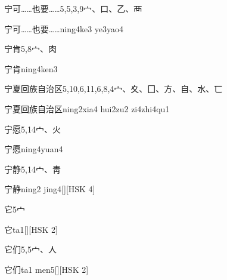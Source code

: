 \begin{Entry}{宁可……也要……}{5,5,3,9}{⼧、⼝、⼄、⾑}
  \begin{Phonetics}{宁可……也要……}{ning4ke3 ye3yao4}
  \end{Phonetics}
\end{Entry}

\begin{Entry}{宁肯}{5,8}{⼧、⾁}
  \begin{Phonetics}{宁肯}{ning4ken3}
  \end{Phonetics}
\end{Entry}

\begin{Entry}{宁夏回族自治区}{5,10,6,11,6,8,4}{⼧、⼢、⼞、⽅、⾃、⽔、⼖}
  \begin{Phonetics}{宁夏回族自治区}{ning2xia4 hui2zu2 zi4zhi4qu1}
  \end{Phonetics}
\end{Entry}

\begin{Entry}{宁愿}{5,14}{⼧、⽕}
  \begin{Phonetics}{宁愿}{ning4yuan4}
  \end{Phonetics}
\end{Entry}

\begin{Entry}{宁静}{5,14}{⼧、⾭}
  \begin{Phonetics}{宁静}{ning2 jing4}[][HSK 4]
  \end{Phonetics}
\end{Entry}

\begin{Entry}{它}{5}{⼧}
  \begin{Phonetics}{它}{ta1}[][HSK 2]
  \end{Phonetics}
\end{Entry}

\begin{Entry}{它们}{5,5}{⼧、⼈}
  \begin{Phonetics}{它们}{ta1 men5}[][HSK 2]
  \end{Phonetics}
\end{Entry}

